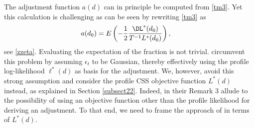 {{The adjustment function $a(d)$ can in principle be computed from \eqref{tm3}. Yet this calculation is challenging as can be seen by rewriting \eqref{tm3} as 
\begin{align}
      a(d_0)  &= E \left( - \frac{1}{2}\frac{\DL^*(d_0)}{T^{-1} L^*(d_0)}  \right), \label{diffadj}
\end{align}
see \eqref{zzeta}. Evaluating the expectation of the fraction is not trivial. \textcite{martellosio2020adjusted} circumvent this problem by assuming $\epsilon_t$ to be Gaussian, thereby effectively using the profile
log-likelihood $\ell^*(d)$ as basis for the adjustment. We, however, avoid this strong assumption and consider the profile CSS objective function $L^*(d)$ instead, as explained in Section \ref{subsect22}. Indeed, \textcite{mccullagh1990simple} in their Remark 3 allude to the possibility of using an
objective function other than the profile likelihood for deriving an adjustment. To that end, we
need to frame the approach of \textcite{mccullagh1990simple} in terms of $L^*(d)$.

}}
